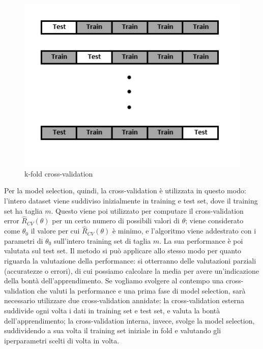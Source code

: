 \documentclass[oneside, openany]{book}
\begin{document}
		\begin{figure}
			\begin{center}
				\begin{minipage}{0.47\textwidth}
					\centering
					\includegraphics[width=\textwidth]{CV1.png}
					\caption{k-fold cross-validation}
					\label{fig:crossval}
				\end{minipage}
				
			\end{center}
		\end{figure}
		Per la model selection, quindi, la cross-validation è utilizzata in questo modo: l'intero dataset viene suddiviso inizialmente in training e test set, dove il training set ha taglia $m$. Questo viene poi utilizzato per computare il cross-validation error $\widehat{R}_{CV}(\theta)$ per un certo numero di possibili valori di $\theta$; viene considerato come $\theta_0$ il valore per cui $\widehat{R}_{CV}(\theta)$ è minimo, e l'algoritmo viene addestrato con i parametri di $\theta_0$ sull'intero training set di taglia $m$. La sua performance è poi valutata sul test set.
		Il metodo si può applicare allo stesso modo per quanto riguarda la valutazione della performance: si otterranno delle valutazioni parziali (accuratezze o errori), di cui possiamo calcolare la media per avere un'indicazione della bontà dell'apprendimento. Se vogliamo svolgere al contempo una cross-validation che valuti la performance e una prima fase di model selection, sarà necessario utilizzare due cross-validation annidate: la cross-validation esterna suddivide ogni volta i dati in training set e test set, e valuta la bontà dell'apprendimento; la cross-validation interna, invece, svolge la model selection, suddividendo a sua volta il training set iniziale in fold e valutando gli iperparametri scelti di volta in volta.
		
\end{document}
